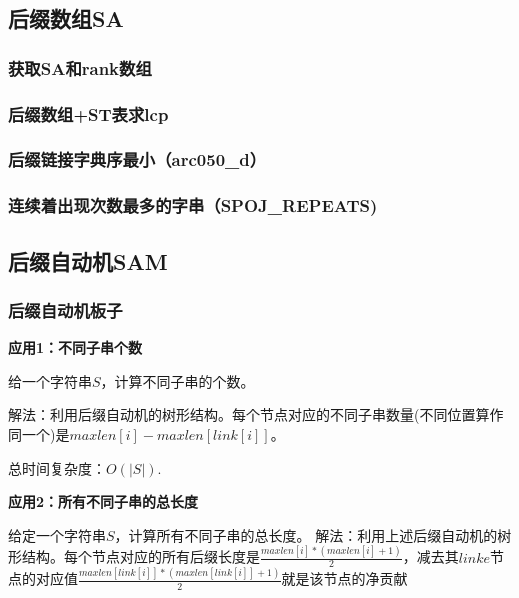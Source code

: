\documentclass[twoside,a4paper]{article}
\begin{document}
\subsection{后缀数组SA}

\subsubsection{获取SA和rank数组}


\subsubsection{后缀数组+ST表求lcp}


\subsubsection{后缀链接字典序最小（arc050\_d）}


\subsubsection{连续着出现次数最多的字串（SPOJ\_REPEATS)}


\subsection{后缀自动机SAM}

\subsubsection{后缀自动机板子}
\textbf{应用1：不同子串个数}\par
给一个字符串$S$，计算不同子串的个数。\par
解法：利用后缀自动机的树形结构。每个节点对应的不同子串数量(不同位置算作同一个)是$maxlen[i]-maxlen[link[i]]$。\par
总时间复杂度：$O(|S|)$.\par
\textbf{应用2：所有不同子串的总长度}\par
给定一个字符串$S$，计算所有不同子串的总长度。
解法：利用上述后缀自动机的树形结构。每个节点对应的所有后缀长度是$\frac{maxlen[i]\ast (maxlen[i]+1)}{2}$，减去其$linke$节点的对应值$\frac{maxlen[link[i]]\ast (maxlen[link[i]]+1)}{2}$就是该节点的净贡献

\end{document}
